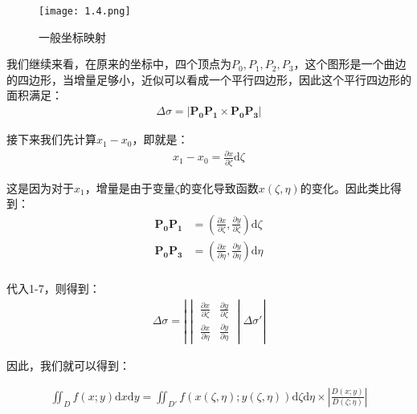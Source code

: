 \documentclass{ctexart}
\begin{document}
\begin{figure}[H]    
\centering     
\renewcommand{\figurename}{图}     
\renewcommand{\thefigure}{1.4}    
\begin{myimagebox}[width=0.88\textwidth] %
\texttt{[image: 1.4.png]} %
\end{myimagebox}     
\caption{\label{fig:1.4}一般坐标映射}   
\end{figure}

我们继续来看，在原来的坐标中，四个顶点为$P_0,P_1,P_2,P_3$，这个图形是一个曲边的四边形，当增量足够小，近似可以看成一个平行四边形，因此这个平行四边形的面积满足：
\begin{align*}
   \Delta \sigma=|\bm{P_0P_1}\times\bm{P_0P_3} |\tag{1-7} 
\end{align*}

接下来我们先计算$x_1-x_0$，即就是：
\begin{align*}
x_1-x_0=\frac{\partial x}{\partial\zeta} \mathrm{d}\zeta 
\end{align*}

这是因为对于$x_1$，增量是由于变量$\zeta$的变化导致函数$x(\zeta,\eta)$的变化。因此类比得到：
\begin{align*}
\bm{P_0P_1}&=(\frac{\partial x}{\partial \zeta}, 
\frac{\partial y}{\partial \zeta})\mathrm{d}\zeta \\
\bm{P_0P_3}&=(\frac{\partial x}{\partial \eta}, 
\frac{\partial y}{\partial \eta})\mathrm{d}\eta \\
\end{align*}

代入1-7，则得到：
\begin{align*}
\Delta \sigma=\left |  \begin{vmatrix}
 \frac{\partial x}{\partial \zeta} & \frac{\partial y}{\partial \zeta}\\
 \frac{\partial x}{\partial \eta} &\frac{\partial y}{\partial \eta}
\end{vmatrix} \Delta \sigma' \right |
\end{align*}

因此，我们就可以得到：
\begin{tcolorbox}[
    colback=bac2,     %
    colframe=fra2,   %
    coltitle=white,             %
    coltext=tex1,
    title=二重积分的一般映射
    fonttitle=\bfseries,        %
    arc=3mm                     %
]
\begin{align*}
\iint_D f(x;y)\mathrm{d}x\mathrm{d}y=\iint_{D'}f(x(\zeta,\eta);y(\zeta,\eta))\mathrm{d}\zeta
\mathrm{d}\eta\times |\frac{D(x;y)}{D(\zeta;\eta)}|  \tag{1-8}   
\end{align*}
\end{tcolorbox}
\end{document}

